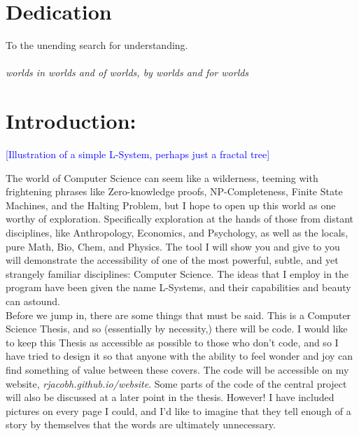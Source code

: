 \documentclass[12pt,twoside]{reedthesis}
\begin{document}
\chapter*{Dedication}
	To the unending search for understanding. \\\\
	\textit{worlds in worlds and of worlds, by worlds and for worlds}

  \mainmatter %
  \pagestyle{fancyplain} %

\chapter{Introduction: }
	
\textcolor{blue}{[Illustration of a simple L-System, perhaps just a fractal tree]}

The world of Computer Science can seem like a wilderness, teeming with frightening phrases like Zero-knowledge proofs, NP-Completeness, Finite State Machines, and the Halting Problem, but I hope to open up this world as one worthy of exploration. Specifically exploration at the hands of those from distant disciplines, like Anthropology, Economics, and Psychology, as well as the locals, pure Math, Bio, Chem, and Physics. The tool I will show you and give to you will demonstrate the accessibility of one of the most powerful, subtle, and yet strangely familiar disciplines: Computer Science. The ideas that I employ in the program have been given the name L-Systems, and their capabilities and beauty can astound.\\
	
Before we jump in, there are some things that must be said. This is a Computer Science Thesis, and so (essentially by necessity,) there will be code. I would like to keep this Thesis as accessible as possible to those who don’t code, and so I have tried to design it so that anyone with the ability to feel wonder and joy can find something of value between these covers. The code will be accessible on my website, \textit{rjacobh.github.io/website}. Some parts of the code of the central project will also be discussed at a later point in the thesis. However! I have included pictures on every page I could, and I’d like to imagine that they tell enough of a story by themselves that the words are ultimately unnecessary.\\
\end{document}

